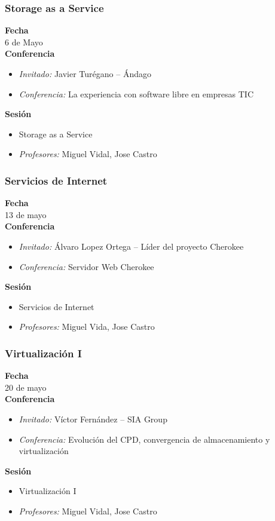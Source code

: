 \documentclass{beamer}
\begin{document}
\begin{frame}
  \frametitle{Storage as a Service}
  \textbf{Fecha}\\
    6 de Mayo\\
  \textbf{Conferencia}
    \begin{itemize}
      \item \textit{Invitado:} Javier Turégano -- Ándago
      \item \textit{Conferencia:} La experiencia con software libre en empresas TIC
    \end{itemize}
  \textbf{Sesión}
    \begin{itemize}
      \item Storage as a Service
      \item \textit{Profesores:} Miguel Vidal, Jose Castro
    \end{itemize}
\end{frame}

\begin{frame}
  \frametitle{Servicios de Internet}
  \textbf{Fecha}\\
    13 de mayo\\
  \textbf{Conferencia}
    \begin{itemize}
      \item \textit{Invitado:} Álvaro Lopez Ortega -- Líder del proyecto Cherokee
      \item \textit{Conferencia:} Servidor Web Cherokee
    \end{itemize}
  \textbf{Sesión}
    \begin{itemize}
      \item Servicios de Internet
      \item \textit{Profesores:} Miguel Vida, Jose Castro
    \end{itemize}
\end{frame}

\begin{frame}
  \frametitle{Virtualización I}
  \textbf{Fecha}\\
    20 de mayo\\
  \textbf{Conferencia}
    \begin{itemize}
      \item \textit{Invitado:} Víctor Fernández -- SIA Group
      \item \textit{Conferencia:} Evolución del CPD, convergencia de almacenamiento y virtualización
    \end{itemize}
  \textbf{Sesión}
    \begin{itemize}
      \item Virtualización I
      \item \textit{Profesores:} Miguel Vidal, Jose Castro
    \end{itemize}
\end{frame}
\end{document}
